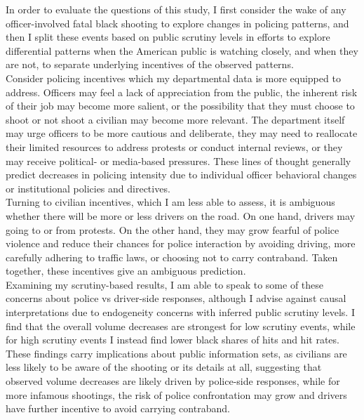 \documentclass[12pt,a4paper]{article}
\begin{document}
In order to evaluate the questions of this study, I first consider the wake of any officer-involved fatal black shooting to explore changes in policing patterns, and then I split these events based on public scrutiny levels in efforts to explore differential patterns when the American public is watching closely, and when they are not, to separate underlying incentives of the observed patterns. \\

Consider policing incentives which my departmental data is more equipped to address. Officers may feel a lack of appreciation from the public, the inherent risk of their job may become more salient, or the possibility that they must choose to shoot or not shoot a civilian may become more relevant. The department itself may urge officers to be more cautious and deliberate, they may need to reallocate their limited resources to address protests or conduct internal reviews, or they may receive political- or media-based pressures. These lines of thought generally predict decreases in policing intensity due to individual officer behavioral changes or institutional policies and directives. \\

Turning to civilian incentives, which I am less able to assess, it is ambiguous whether there will be more or less drivers on the road. On one hand, drivers may going to or from protests. On the other hand, they may grow fearful of police violence and reduce their chances for police interaction by avoiding driving, more carefully adhering to traffic laws, or choosing not to carry contraband. Taken together, these incentives give an ambiguous prediction. \\

Examining my scrutiny-based results, I am able to speak to some of these concerns about police vs driver-side responses, although I advise against causal interpretations due to endogeneity concerns with inferred public scrutiny levels. I find that the overall volume decreases are strongest for low scrutiny events, while for high scrutiny events I instead find lower black shares of hits and hit rates. These findings carry implications about public information sets, as civilians are less likely to be aware of the shooting or its details at all, suggesting that observed volume decreases are likely driven by police-side responses, while for more infamous shootings, the risk of police confrontation may grow and drivers have further incentive to avoid carrying contraband. \\
\end{document}
